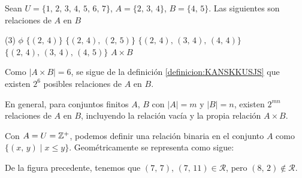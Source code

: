 \begin{myexample}
    Sean $U = \{ 1, \, 2, \, 3, \, 4, \, 5, \, 6, \, 7 \}$, $A = \{ 2, \, 3, \, 4 \}$, $B = \{ 4, \, 5 \}$. Las siguientes son relaciones de $A$ en $B$
    \begin{tasks}(3)
        \task $\phi$
        \task $\{ (2, \, 4) \}$
        \task $\{ (2, \, 4), \, (2, \, 5) \}$
        \task $\{ (2, \, 4), \, (3, \, 4), \, (4, \, 4) \}$
        \task $\{ (2, \, 4), \, (3, \, 4), \, (4, \, 5) \}$
        \task $A \times B$
    \end{tasks}
    Como $|A \times B| = 6$, se sigue de la definición \ref{definicion:KANSKKUSJS} que existen $2^6$ posibles relaciones de $A$ en $B$.
\end{myexample}

\begin{BOX}
    En general, para conjuntos finitos $A$, $B$ con $|A| = m$ y $|B| = n$, existen $2^{mn}$ relaciones de $A$ en $B$, incluyendo la relación vacía y la propia relación $A \times B$.
\end{BOX}

\begin{myexample}
    Con $A = U = \ZZ[+]$, podemos definir una relación binaria en el conjunto $A$ como $\{ (x, \, y) \mid x \leq y \}$. Geométricamente se representa como sigue:
    \begin{center}
    \end{center}
    De la figura precedente, tenemos que $(7, \, 7)$, $(7, \, 11) \in \mathcal{R}$, pero $(8, \, 2) \notin \mathcal{R}$.
\end{myexample}

